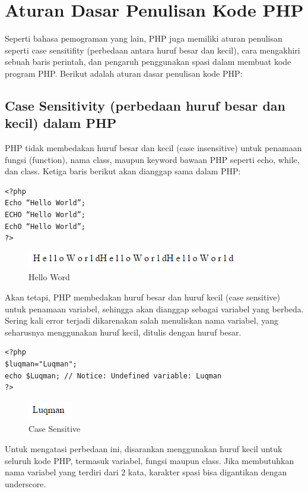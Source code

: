 \section{Aturan Dasar Penulisan Kode PHP}
Seperti bahasa pemograman yang lain, PHP juga memiliki aturan penulisan seperti case sensitifity (perbedaan antara huruf besar dan kecil), cara mengakhiri sebuah baris perintah, dan pengaruh penggunakan spasi dalam membuat kode program PHP. Berikut adalah aturan dasar penulisan kode PHP:
\subsection{Case Sensitivity (perbedaan huruf besar dan kecil) dalam PHP}
PHP tidak membedakan huruf besar dan kecil (case insensitive) untuk penamaan fungsi (function), nama class, maupun keyword bawaan PHP seperti echo, while, dan class. Ketiga baris berikut akan dianggap sama dalam PHP:
\begin{lstlisting}
<?php
Echo “Hello World”;
ECHO “Hello World”;
EchO “Hello World”;
?>
\end{lstlisting}
\begin{figure}[h]
\centering
\includegraphics[scale=1]{figures/hello1}
\caption{Hello Word}
\label{helloword}
\end{figure}
Akan tetapi, PHP membedakan huruf besar dan huruf kecil (case sensitive) untuk penamaan variabel, sehingga akan dianggap sebagai variabel yang berbeda. Sering kali error terjadi dikarenakan salah menuliskan nama variabel, yang seharusnya menggunakan huruf kecil, ditulis dengan huruf besar.
\begin{lstlisting}
<?php
$luqman="Luqman";
echo $Luqman; // Notice: Undefined variable: Luqman
?>
\end{lstlisting}
\begin{figure}[h]
\centering
\includegraphics[scale=1]{figures/luqman}
\caption{Case Sensitive}
\label{case}
\end{figure}
Untuk mengatasi perbedaan ini, disarankan menggunakan huruf kecil untuk seluruh kode PHP, termasuk variabel, fungsi maupun class. Jika membutuhkan nama variabel yang terdiri dari 2 kata, karakter spasi bisa digantikan dengan underscore.
